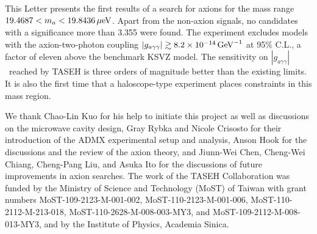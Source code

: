 \documentclass[%
 reprint,prl, %
superscriptaddress,
 amsmath,amssymb,
 aps,
]{revtex4-2}
\newcommand{\gagg}{\ensuremath{\left|g_{a\gamma\gamma}\right|}}
\newcommand{\ma}{\ensuremath{m_a}}
\newcommand{\muevcc}{\ensuremath{\,\mu\text{e\hspace{-.08em}V}}}
\newcommand{\GeVinv}{\ensuremath{\,\text{Ge\hspace{-.08em}V}^{-1}}}
\newcommand{\mlo}{\ensuremath{19.4687}}
\newcommand{\mhi}{\ensuremath{19.8436}}
\newcommand{\avelimit}{\ensuremath{8.2\times 10^{-14}}} %
\begin{document}
This Letter presents the first results of a search for axions for the mass 
range $\mlo < \ma < \mhi \muevcc$. 
Apart from the non-axion signals, no candidates with a significance more than
3.355 were found. The experiment excludes models with the 
axion-two-photon coupling $\gagg\gtrsim \avelimit\GeVinv$ at 95\% C.L.,
 a factor of eleven 
above the benchmark KSVZ model. The sensitivity on \gagg\ reached by TASEH 
is three orders of magnitude better than the existing limits. 
It is also the first time that a haloscope-type experiment places 
constraints in this mass region. 


\begin{acknowledgments}
We thank Chao-Lin Kuo for his help to initiate this project as well as
discussions on the microwave cavity design, Gray Rybka and Nicole Crisosto
for their introduction of the ADMX experimental
setup and analysis, Anson Hook for the discussions and the review of the
axion theory, and Jiunn-Wei Chen, Cheng-Wei Chiang, Cheng-Pang Liu, and
Asuka Ito for the discussions of future improvements in axion searches.
  The work of the TASEH Collaboration was funded by
the Ministry of Science and Technology (MoST) of Taiwan with grant numbers
MoST-109-2123-M-001-002, MoST-110-2123-M-001-006, MoST-110-2112-M-213-018,
MoST-110-2628-M-008-003-MY3,
and MoST-109-2112-M-008-013-MY3, and by the Institute of Physics, Academia
Sinica.
\end{acknowledgments}

\end{document}
